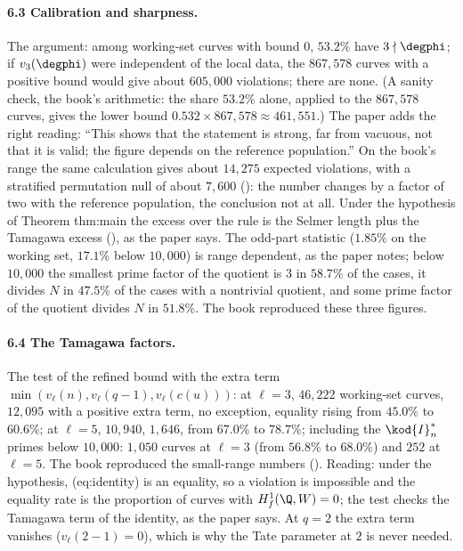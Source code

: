 \begin{sloppypar}
\paragraph{6.3 Calibration and sharpness.} The argument: among working-set curves with bound $0$, $53.2\%$ have $3\nmid\degphi$; if $v_3(\degphi)$ were independent of the local data, the
$867{,}578$ curves with a positive bound would give about $605{,}000$ violations; there are none. (A sanity check, the book's arithmetic: the share $53.2\%$ alone, applied to the
$867{,}578$ curves, gives the lower bound $0.532\times867{,}578\approx461{,}551$.) The paper adds the right reading: ``This shows that the statement is strong, far from vacuous, not that it is
valid; the figure depends on the reference population.'' On the book's range the same calculation gives about $14{,}275$ expected violations, with a stratified permutation null of
about $7{,}600$ (): the number changes by a factor of two with the reference population, the conclusion not at all. Under the hypothesis of Theorem thm:main the
excess over the rule is the Selmer length plus the Tamagawa excess (), as the paper says. The odd-part statistic ($1.85\%$ on the working set, $17.1\%$ below
$10{,}000$) is range dependent, as the paper notes; below $10{,}000$ the smallest prime factor of the quotient is $3$ in $58.7\%$ of the cases, it divides $N$ in $47.5\%$ of the cases with a
nontrivial quotient, and some prime factor of the quotient divides $N$ in $51.8\%$. The book reproduced these three figures.

\paragraph{6.4 The Tamagawa factors.} The test of the refined bound with the extra term $\min(v_\ell(n),v_\ell(q-1),v_\ell(c(u)))$: at $\ell=3$, $46{,}222$ working-set curves, $12{,}095$ with a positive
extra term, no exception, equality rising from $45.0\%$ to $60.6\%$; at $\ell=5$, $10{,}940$, $1{,}646$, from $67.0\%$ to $78.7\%$; including the $\kod{I}_n^*$ primes below $10{,}000$: $1{,}050$ curves at $\ell=3$
(from $56.8\%$ to $68.0\%$) and $252$ at $\ell=5$. The book reproduced the small-range numbers (). Reading: under the hypothesis, (eq:identity) is an equality,
so a violation is impossible and the equality rate is the proportion of curves with $H^1_f(\Q,W)=0$; the test checks the Tamagawa term of the identity, as the paper says. At $q=2$ the
extra term vanishes ($v_\ell(2-1)=0$), which is why the Tate parameter at $2$ is never needed.


\end{sloppypar}

